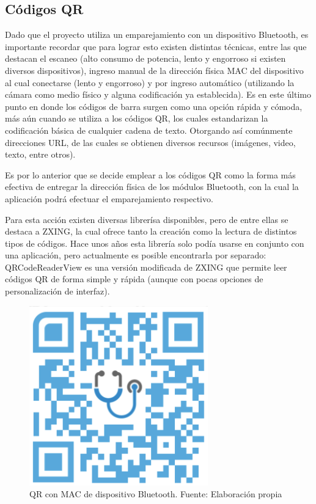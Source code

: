 \newpage

\subsection{Códigos QR}

Dado que el proyecto utiliza un emparejamiento con un dispositivo Bluetooth, es importante recordar que para lograr esto existen distintas técnicas, entre las que destacan el escaneo (alto consumo de potencia, lento y engorroso si existen diversos dispositivos), ingreso manual de la dirección física MAC del dispositivo al cual conectarse (lento y engorroso) y por ingreso automático (utilizando la cámara como medio físico y alguna codificación ya establecida). Es en este último punto en donde los códigos de barra surgen como una opción rápida y cómoda, más aún cuando se utiliza a los códigos QR, los cuales estandarizan la codificación básica de cualquier cadena de texto. Otorgando así comúnmente direcciones URL, de las cuales se obtienen diversos recursos (imágenes, video, texto, entre otros).

Es por lo anterior que se decide emplear a los códigos QR como la forma más efectiva de entregar la dirección física de los módulos Bluetooth, con la cual la aplicación podrá efectuar el emparejamiento respectivo.

Para esta acción existen diversas librerísa disponibles, pero de entre ellas se destaca a ZXING, la cual ofrece tanto la creación como la lectura de distintos tipos de códigos. Hace unos años esta librería solo podía usarse en conjunto con una aplicación, pero actualmente es posible encontrarla por separado: QRCodeReaderView es una versión modificada de ZXING que permite leer códigos QR de forma simple y rápida (aunque con pocas opciones de personalización de interfaz).

\begin{figure}[H]
	\centering
	\includegraphics[scale=0.6]{figuras/proto1/qr.png}
	\caption{QR con MAC de dispositivo Bluetooth. Fuente: Elaboración propia}
	\label{qr}
\end{figure}

